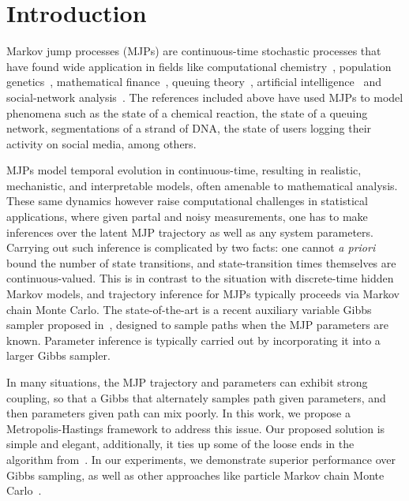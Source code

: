\section{Introduction}
\label{sec:intro}
Markov jump processes (MJPs) are continuous-time stochastic processes that
have found wide application in fields like computational chemistry~\cite{gillespie97}, 
population genetics~\cite{FearnSher2006}, mathematical finance~\cite{Elliott06}, 
queuing theory~\cite{Breuer2003}, artificial intelligence~\cite{XuShe10} and
social-network analysis~\cite{pan2016markov}. The references included above have
used MJPs to model phenomena such as the state of a chemical reaction, the state 
of a queuing network, segmentations of a strand of DNA, the state of users 
logging their activity on social media, among others.

MJPs model temporal evolution in continuous-time, resulting in 
realistic, mechanistic, and interpretable models, often amenable to 
mathematical analysis. These same dynamics however raise computational
challenges in statistical applications, where given partal and noisy 
measurements, one has to make inferences over the latent MJP 
trajectory as well as any system parameters. Carrying out such
inference is complicated by two facts: one cannot {\em a priori} 
bound the number of state transitions, and state-transition times themselves
are continuous-valued. This is in contrast to the situation with
discrete-time hidden Markov models, and trajectory inference for 
MJPs typically proceeds via Markov chain Monte Carlo. The 
state-of-the-art is a recent auxiliary variable Gibbs sampler proposed 
in~\cite{RaoTeh13},  designed to sample paths when the MJP parameters
are known. Parameter inference is typically carried out by 
incorporating it into a larger Gibbs sampler. 

In many situations, the MJP trajectory and parameters can exhibit 
strong coupling, so that a Gibbs that alternately samples path given
parameters, and then parameters given path can mix poorly.  
In this work, we propose a Metropolis-Hastings framework to address
this issue. Our proposed solution is simple and elegant, additionally,
it ties up some of the loose ends in the algorithm 
from~\cite{RaoTeh13}.  In our experiments, we demonstrate superior 
performance over Gibbs sampling, as well as other approaches like 
particle Markov chain Monte Carlo~\cite{Andrieu10}.


